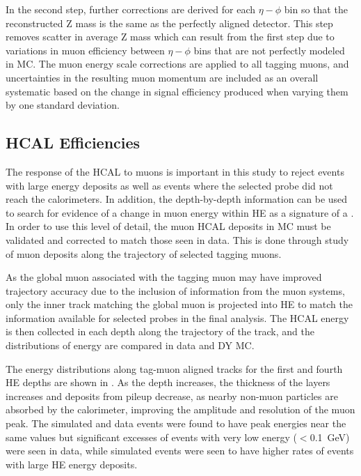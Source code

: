 In the second step, further corrections are derived for each $\eta-\phi$ bin so that the reconstructed Z mass is the same as the perfectly aligned detector. 
This step removes scatter in average Z mass which can result from the first step due to variations in muon efficiency between $\eta-\phi$ bins that are not perfectly modeled in MC. 
The muon energy scale corrections are applied to all tagging muons, and uncertainties in the resulting muon momentum are included as an overall systematic based on the change in signal efficiency produced when varying them by one standard deviation.

\subsection{HCAL Efficiencies}
\label{sec:HCALeff}
The response of the HCAL to muons is important in this study to reject events with large energy deposits as well as events where the selected probe did not reach the calorimeters.
In addition, the depth-by-depth information can be used to search for evidence of a change in muon energy within HE as a signature of a \dbrem.
In order to use this level of detail, the muon HCAL deposits in MC must be validated and corrected to match those seen in data.
This is done through study of muon deposits along the trajectory of selected tagging muons.

As the global muon associated with the tagging muon may have improved trajectory accuracy due to the inclusion of information from the muon systems, only the inner track matching the global muon is projected into HE to match the information available for selected probes in the final analysis.
The HCAL energy is then collected in each depth along the trajectory of the track, and the distributions of energy are compared in data and DY MC.

The energy distributions along tag-muon aligned tracks for the first and fourth HE depths are shown in .
As the depth increases, the thickness of the layers increases and deposits from pileup decrease, as nearby non-muon particles are absorbed by the calorimeter, improving the amplitude and resolution of the muon peak.
The simulated and data events were found to have peak energies near the same values but significant excesses of events with very low energy ($<$\SI{0.1}{\giga\eV}) were seen in data, while simulated events were seen to have higher rates of events with large HE energy deposits.

